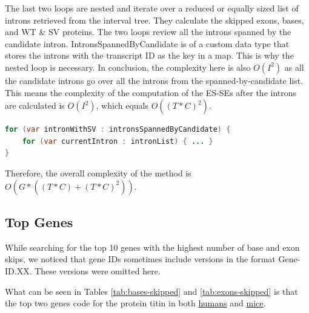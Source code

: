 \documentclass{article}
\begin{document}
    The last two loops are nested and iterate over a reduced or equally sized list of introns retrieved from the interval tree. They calculate the skipped exons, bases, and WT \& SV proteins. The two loops review all the introns spanned by the candidate intron. IntronsSpannedByCandidate is of a custom data type that stores the introns with the transcript ID as the key in a map. This is why the nested loop is necessary. In conclusion, the complexity here is also $O(I^2)$ as all the candidate introns go over all the introns from the spanned-by-candidate list. This means the complexity of the computation of the ES-SEs after the introns are calculated is $O(I^2)$, which equals $O((T * C)^2)$.

    \begin{lstlisting}[language=Java]
for (var intronWithSV : intronsSpannedByCandidate) {
    for (var currentIntron : intronList) { ... }
}
    \end{lstlisting}

    Therefore, the overall complexity of the method is $O(G * ((T*C) + (T*C)^2))$.

    \subsection{Top Genes}

    While searching for the top 10 genes with the highest number of base and exon skips, we noticed that gene IDs sometimes include versions in the format Gene-ID.XX. These versions were omitted here.

    What can be seen in Tables \ref{tab:bases-skipped} and \ref{tab:exons-skipped} is that the top two genes code for the protein titin in both \href{https://www.uniprot.org/uniprotkb/Q8WZ42/entry}{humans} and \href{https://www.uniprot.org/uniprotkb/A2ASS6/entry}{mice}.
\end{document}
